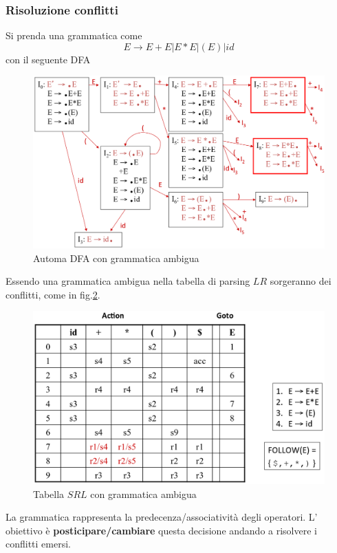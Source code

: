 \subsubsection{Risoluzione conflitti}
Si prenda una grammatica come
$$E \to E+E|E*E|(E)|id$$
con il seguente DFA
\begin{figure}[H]
\centering
\includegraphics[scale=0.36]{res/image/DFA_ambiguos}
\caption{Automa DFA con grammatica ambigua}
\label{img:DFA_ambiguos}
\end{figure}

Essendo una grammatica ambigua nella tabella di parsing $LR$ sorgeranno dei
conflitti, come in fig.\ref{img:LR_table_ambiguos}.

\begin{figure}[H]
\centering
\includegraphics[scale=0.4]{res/image/LR_table_ambiguos}
\caption{Tabella $SRL$ con grammatica ambigua}
\label{img:LR_table_ambiguos}
\end{figure}

La grammatica rappresenta la predecenza/associativit\`a degli operatori. L'
obiettivo \`e \textbf{posticipare/cambiare} questa decisione andando a
risolvere i conflitti emersi.

